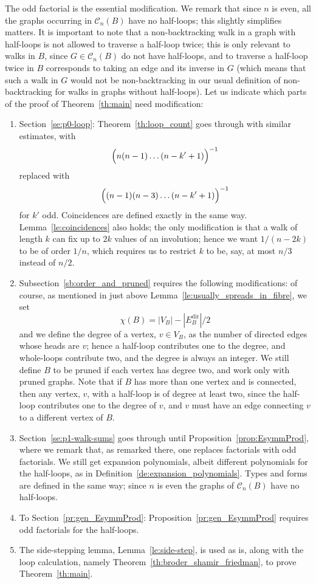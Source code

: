 \documentclass{memo-l}
\theoremstyle{plain}
\theoremstyle{definition}
\numberwithin{section}{chapter}
\numberwithin{equation}{chapter}
\newcommand{\Edir}{E^{\mathrm{dir}}}
\theoremstyle{plain}
\theoremstyle{definition}
\newcommand\cC{\mathcal{C}}
\begin{document}
The odd factorial is the essential modification.  
We remark that since $n$ is even, all the graphs occurring in $\cC_n(B)$
have no half-loops; this slightly simplifies matters.
It is important to note that a non-backtracking walk in a graph with
half-loops is not allowed to traverse a half-loop twice; this is
only relevant to walks in $B$, 
since $G\in\cC_n(B)$ do not have half-loops, and to traverse a 
half-loop twice in $B$ corresponds to taking an edge and its inverse
in $G$ (which means that such a walk in $G$ would not be non-backtracking
in our usual definition of non-backtracking for walks in graphs without
half-loops).
Let us indicate
which parts of the proof of Theorem~\ref{th:main} need modification:

\begin{enumerate}
\item Section~\ref{se:p0-loop}: Theorem~\ref{th:loop_count} goes
through with similar estimates, with
$$
\Bigl( n (n-1) \ldots (n-k'+1) \Bigr)^{-1}
$$
replaced with
$$
\Bigl( (n-1) (n-3) \ldots (n-k'+1) \Bigr)^{-1}
$$
for $k'$ odd.
Coincidences are defined exactly in the same way.
Lemma~\ref{le:coincidences} also holds; the only modification is that
a walk of length $k$
can fix up to $2k$ values of an involution;  hence we want 
$1/(n-2k)$ to be of order $1/n$, which requires us to restrict
$k$ to be, say, at most $n/3$ instead of $n/2$.
\item Subsection~\ref{sb:order_and_pruned} requires the following
modifications: of course, as mentioned in just above
Lemma~\ref{le:usually_spreads_in_fibre}, we set
$$
\chi(B) = |V_B| - |\Edir_B|/2
$$
and we define the degree of a vertex, $v\in V_B$, 
as the number of
directed edges whose heads are $v$; hence a half-loop contributes
one to the degree, and whole-loops contribute two, and the degree
is always an integer.
We still define $B$ to be pruned if each vertex has degree two, and
work only with pruned graphs.
Note that if $B$ has more than one vertex and is connected, 
then any vertex, $v$, with a half-loop is
of degree at least two, since the half-loop contributes one to 
the degree of $v$,
and $v$ must have an edge connecting $v$ to a different vertex of $B$.
\item Section~\ref{se:p1-walk-sums} goes through until
Proposition~\ref{prop:EsymmProd}, where we remark that, as remarked
there, one replaces factorials with odd factorials.
We still get expansion polynomials, albeit different polynomials for
the half-loops, as in Definition~\ref{de:expansion_polynomials}.
Types and forms are defined in the same way; since $n$ is even
the graphs of $\cC_n(B)$ have no half-loops.
\item To Section~\ref{pr:gen_EsymmProd}:
Proposition~\ref{pr:gen_EsymmProd} requires odd factorials for the
half-loops.
\item The side-stepping lemma, Lemma~\ref{le:side-step}, is used
as is, along with the loop calculation, namely 
Theorem~\ref{th:broder_shamir_friedman}, to prove
Theorem~\ref{th:main}.
\end{enumerate}
\end{document}
